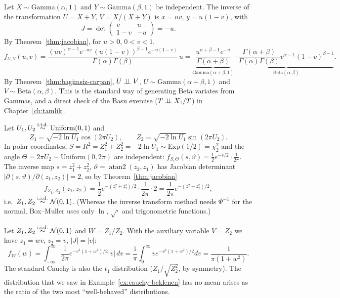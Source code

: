 \documentclass[main.tex]{subfiles}
\begin{document}
\begin{example}\label{ex:beta-gamma}
Let $X\sim\text{Gamma}(\alpha,1)$ and $Y\sim\text{Gamma}(\beta,1)$ be independent. The inverse of the transformation $U=X+Y$, $V=X/(X+Y)$ is $x=uv$, $y=u(1-v)$, with
\[
J=\det\begin{pmatrix}v & u\\ 1-v & -u\end{pmatrix}=-u .
\]
By Theorem~\ref{thm:jacobian}, for $u>0$, $0<v<1$,
\[
f_{U,V}(u,v)=\frac{(uv)^{\alpha-1}e^{-uv}\,(u(1-v))^{\beta-1}e^{-u(1-v)}}{\Gamma(\alpha)\Gamma(\beta)}\,u
=\underbrace{\frac{u^{\alpha+\beta-1}e^{-u}}{\Gamma(\alpha+\beta)}}_{\text{Gamma}(\alpha+\beta,1)}\cdot\underbrace{\frac{\Gamma(\alpha+\beta)}{\Gamma(\alpha)\Gamma(\beta)}v^{\alpha-1}(1-v)^{\beta-1}}_{\text{Beta}(\alpha,\beta)} .
\]
By Theorem~\ref{thm:bagimsiz-carpan}, $U\perp\!\!\!\perp V$, $U\sim\text{Gamma}(\alpha+\beta,1)$ and $V\sim\text{Beta}(\alpha,\beta)$. This is the standard way of generating Beta variates from Gammas, and a direct check of the Basu exercise ($T\perp\!\!\!\perp X_1/T$) in Chapter~\ref{ch:tamlik}.
\end{example}

\begin{example}\label{ex:box-muller}
Let $U_1,U_2\overset{\text{i.i.d.}}{\sim}\text{Uniform}(0,1)$ and
\[
Z_1=\sqrt{-2\ln U_1}\cos(2\pi U_2),\qquad Z_2=\sqrt{-2\ln U_1}\sin(2\pi U_2).
\]
In polar coordinates, $S=R^2=Z_1^2+Z_2^2=-2\ln U_1\sim\text{Exp}(1/2)=\chi^2_2$ and the angle $\Theta=2\pi U_2\sim\text{Uniform}(0,2\pi)$ are independent: $f_{S,\Theta}(s,\vartheta)=\frac12e^{-s/2}\cdot\frac1{2\pi}$. The inverse map $s=z_1^2+z_2^2$, $\vartheta=\operatorname{atan2}(z_2,z_1)$ has Jacobian determinant $\big|\partial(s,\vartheta)/\partial(z_1,z_2)\big|=2$, so by Theorem~\ref{thm:jacobian}
\[
f_{Z_1,Z_2}(z_1,z_2)=\frac12e^{-(z_1^2+z_2^2)/2}\cdot\frac{1}{2\pi}\cdot2=\frac{1}{2\pi}e^{-(z_1^2+z_2^2)/2},
\]
i.e.\ $Z_1,Z_2\overset{\text{i.i.d.}}{\sim}\mathcal{N}(0,1)$. (Whereas the inverse transform method needs $\Phi^{-1}$ for the normal, Box--Muller uses only $\ln$, $\sqrt{\cdot}$ and trigonometric functions.)
\end{example}

\begin{example}\label{ex:oran-cauchy}
Let $Z_1,Z_2\overset{\text{i.i.d.}}{\sim}\mathcal{N}(0,1)$ and $W=Z_1/Z_2$. With the auxiliary variable $V=Z_2$ we have $z_1=wv$, $z_2=v$, $|J|=|v|$:
\[
f_W(w)=\int_{-\infty}^\infty\frac{1}{2\pi}e^{-v^2(1+w^2)/2}|v|\,dv=\frac{1}{\pi}\int_0^\infty ve^{-v^2(1+w^2)/2}dv=\frac{1}{\pi(1+w^2)} .
\]
The standard Cauchy is also the $t_1$ distribution ($Z_1/\sqrt{Z_2^2}$, by symmetry). The distribution that we saw in Example~\ref{ex:cauchy-beklenen} has no mean arises as the ratio of the two most ``well-behaved'' distributions.
\end{example}
\end{document}
